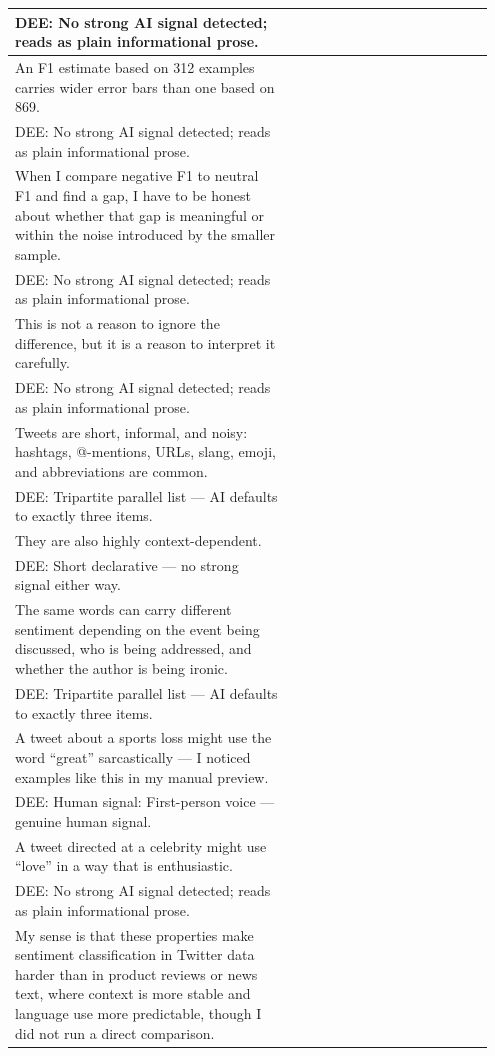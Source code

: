 \documentclass[11pt]{article}
\begin{document}
\begin{longtable}{|p{0.55\linewidth}|p{0.40\linewidth}|}
\hline
DEE: No strong AI signal detected; reads as plain informational prose. & \\
\hline
An F1 estimate based on 312 examples carries wider error bars than one based on 869. & \\[2pt]
\hline
DEE: No strong AI signal detected; reads as plain informational prose. & \\
\hline
When I compare negative F1 to neutral F1 and find a gap, I have to be honest about whether that gap is meaningful or within the noise introduced by the smaller sample. & \\[2pt]
\hline
DEE: No strong AI signal detected; reads as plain informational prose. & \\
\hline
This is not a reason to ignore the difference, but it is a reason to interpret it carefully. & \\[2pt]
\hline
DEE: No strong AI signal detected; reads as plain informational prose. & \\
\hline
Tweets are short, informal, and noisy: hashtags, @-mentions, URLs, slang, emoji, and abbreviations are common. & \\[2pt]
\hline
DEE: Tripartite parallel list --- AI defaults to exactly three items. & \\
\hline
They are also highly context-dependent. & \\[2pt]
\hline
DEE: Short declarative --- no strong signal either way. & \\
\hline
The same words can carry different sentiment depending on the event being discussed, who is being addressed, and whether the author is being ironic. & \\[2pt]
\hline
DEE: Tripartite parallel list --- AI defaults to exactly three items. & \\
\hline
A tweet about a sports loss might use the word ``great'' sarcastically --- I noticed examples like this in my manual preview. & \\[2pt]
\hline
DEE: Human signal: First-person voice --- genuine human signal. & \\
\hline
A tweet directed at a celebrity might use ``love'' in a way that is enthusiastic. & \\[2pt]
\hline
DEE: No strong AI signal detected; reads as plain informational prose. & \\
\hline
My sense is that these properties make sentiment classification in Twitter data harder than in product reviews or news text, where context is more stable and language use more predictable, though I did not run a direct comparison. & \\[2pt]

\end{longtable}
\end{document}
